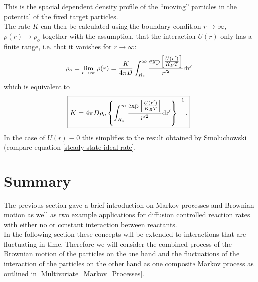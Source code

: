 This is the spacial dependent density profile of the ``moving'' particles in the potential of the fixed target particles. \\
The rate $K$ can then be calculated using the boundary condition $r \rightarrow \infty$, $\rho(r) \rightarrow \rho_o$ together with the assumption, that the interaction $U(r)$ only has a finite range, i.e. that it vanishes for $r \rightarrow \infty$:
\begin{equation}
    \rho_o = \lim_{r\rightarrow \infty} \rho(r) = \frac{K}{4 \pi D}\int_{R_s}^{\infty} \frac{\exp \left[ \frac{U(r')}{K_B T}\right]}{r'^2} \rm d r'
    \label{lim_rho_debye_infty}
\end{equation}
which is equivalent to 
\begin{equation}
    \boxed{K = 4 \pi D \rho_o \left\{\int_{R_s}^{\infty} \frac{\exp \left[ \frac{U(r')}{K_B T}\right]}{r'^2} \rm d r' \right\}^{-1}.}
    \label{K_Debye}
\end{equation}
In the case of $U(r) \equiv 0$ this simplifies to the result obtained by Smoluchowski (compare equation \eqref{steady state ideal rate}. \par
\section{Summary}
The previous section gave a brief introduction on Markov processes and Brownian motion as well as two example applications for diffusion controlled reaction rates with either no or constant interaction between reactants. \\
In the following section these concepts will be extended to interactions that are fluctuating in time. Therefore we will consider the combined process of the Brownian motion of the particles on the one hand and the fluctuations of the interaction of the particles on the other hand as one composite Markov process as outlined in \ref{Multivariate_Markov_Processes}.

\newpage
